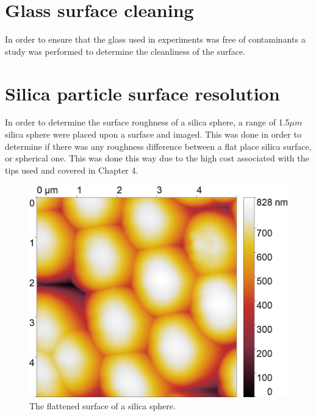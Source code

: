 


\section{Glass surface cleaning}

In order to ensure that the glass used in experiments was free of contaminants a study was performed to determine the cleanliness of the surface.




\section{Silica particle surface resolution} %

In order to determine the surface roughness of a silica sphere, a range of 1.5$\mu m$ silica sphere were placed upon a surface and imaged. This was done in order to determine if there was any roughness difference between a flat place silica surface, or spherical one. This was done this way due to the high cost associated with the tips used and covered in Chapter 4.

\begin{figure}[h]     %
        \begin{center}
          \includegraphics[width=130mm]{chapter3/5umareat2.jpg}
\end{center}
\caption{The flattened surface of a silica sphere.}
\label{fig:Sili2}                 %
\end{figure}

